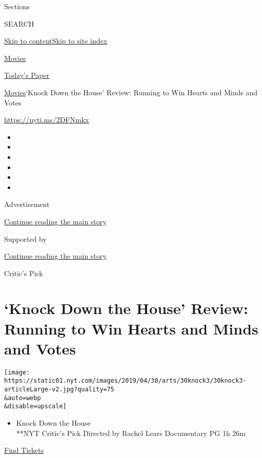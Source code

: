 Sections

SEARCH

\protect\hyperlink{site-content}{Skip to
content}\protect\hyperlink{site-index}{Skip to site index}

\href{https://www.nytimes.com/section/movies}{Movies}

\href{https://myaccount.nytimes.com/auth/login?response_type=cookie\&client_id=vi}{}

\href{https://www.nytimes.com/section/todayspaper}{Today's Paper}

\href{/section/movies}{Movies}\textbar{}`Knock Down the House' Review:
Running to Win Hearts and Minds and Votes

\url{https://nyti.ms/2DFNmkx}

\begin{itemize}
\item
\item
\item
\item
\item
\item
\end{itemize}

Advertisement

\protect\hyperlink{after-top}{Continue reading the main story}

Supported by

\protect\hyperlink{after-sponsor}{Continue reading the main story}

Critic's Pick

\hypertarget{knock-down-the-house-review-running-to-win-hearts-and-minds-and-votes}{%
\section{`Knock Down the House' Review: Running to Win Hearts and Minds
and
Votes}\label{knock-down-the-house-review-running-to-win-hearts-and-minds-and-votes}}

\texttt{[image: https://static01.nyt.com/images/2019/04/30/arts/30knock3/30knock3-articleLarge-v2.jpg?quality=75\\\&auto=webp\\\&disable=upscale]}

\begin{itemize}
\tightlist
\item
  Knock Down the House\\
  **NYT Critic's Pick Directed by Rachel Lears Documentary PG 1h 26m
\end{itemize}

\href{https://www.imdb.com/showtimes/title/tt9358052?ref_=ref_ext_NYT}{Find
Tickets}

